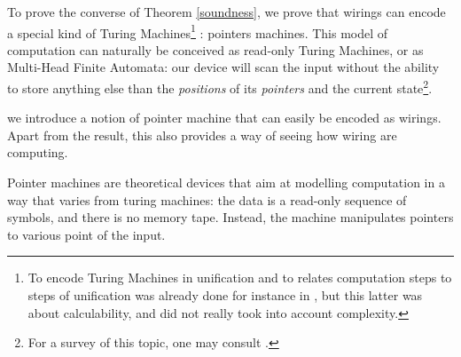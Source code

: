 To prove the converse of Theorem \ref{soundness}, we prove that wirings can encode a special kind of Turing Machines\footnote{%
To encode Turing Machines in unification and to relates computation steps to steps of unification was already done for instance in \cite{Itai1987}, but this latter was about calculability, and did not really took into account complexity.}%
: pointers machines.
This model of computation can naturally be conceived as read-only Turing Machines, or as Multi-Head Finite Automata: our device will scan the input without the ability to store anything else than the \emph{positions} of its \emph{pointers} and the current state\footnote{%
For a survey of this topic, one may consult \cite[Chap.4]{Aubert2013b}.}.

we introduce a notion of pointer machine that can easily be encoded as wirings.
Apart from the result, this also provides a way of seeing how wiring are computing.

Pointer machines \cite{ben-amram_what_1995} are theoretical devices that aim at modelling computation in a way that varies from turing machines: the data is a read-only sequence of symbols, and there is no memory tape. Instead, the machine manipulates pointers to various point of the input.




